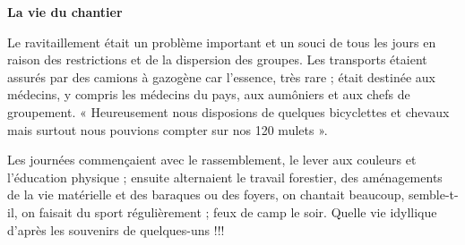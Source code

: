 \textbf{La vie du chantier}

Le ravitaillement était un problème important et un souci de tous les jours en raison
des restrictions et de la dispersion des groupes.
Les transports étaient assurés par des camions à gazogène car l’essence, très rare ;
était destinée aux médecins, y compris les médecins du pays, aux aumôniers et aux
chefs de groupement. « Heureusement nous disposions de quelques bicyclettes et
chevaux mais surtout nous pouvions compter sur nos 120 mulets ».

Les journées commençaient avec le rassemblement, le lever aux couleurs et
l’éducation physique ; ensuite alternaient le travail forestier, des aménagements de la
vie matérielle et des baraques ou des foyers, on chantait beaucoup, semble-t-il, on
faisait du sport régulièrement ; feux de camp le soir.
Quelle vie idyllique d’après les souvenirs de quelques-uns !!!
